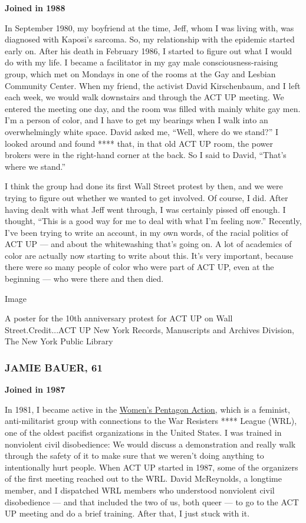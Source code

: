 \textbf{Joined in 1988}

In September 1980, my boyfriend at the time, Jeff, whom I was living
with, was diagnosed with Kaposi's sarcoma. So, my relationship with the
epidemic started early on. After his death in February 1986, I started
to figure out what I would do with my life. I became a facilitator in my
gay male consciousness-raising group, which met on Mondays in one of the
rooms at the Gay and Lesbian Community Center. When my friend, the
activist David Kirschenbaum, and I left each week, we would walk
downstairs and through the ACT UP meeting. We entered the meeting one
day, and the room was filled with mainly white gay men. I'm a person of
color, and I have to get my bearings when I walk into an overwhelmingly
white space. David asked me, ``Well, where do we stand?'' I looked
around and found **** that, in that old ACT UP room, the power brokers
were in the right-hand corner at the back. So I said to David, ``That's
where we stand.''

I think the group had done its first Wall Street protest by then, and we
were trying to figure out whether we wanted to get involved. Of course,
I did. After having dealt with what Jeff went through, I was certainly
pissed off enough. I thought, ``This is a good way for me to deal with
what I'm feeling now.'' Recently, I've been trying to write an account,
in my own words, of the racial politics of ACT UP --- and about the
whitewashing that's going on. A lot of academics of color are actually
now starting to write about this. It's very important, because there
were so many people of color who were part of ACT UP, even at the
beginning --- who were there and then died.

Image

A poster for the 10th anniversary protest for ACT UP on Wall
Street.Credit...ACT UP New York Records, Manuscripts and Archives
Division, The New York Public Library

\hypertarget{jamie-bauer-61}{%
\subsubsection{JAMIE BAUER, 61}\label{jamie-bauer-61}}

\textbf{Joined in 1987}

In 1981, I became active in the
\href{http://www.wloe.org/WLOE-en/background/wpastatem.html}{Women's
Pentagon Action}, which is a feminist, anti-militarist group with
connections to the War Resisters **** League (WRL), one of the oldest
pacifist organizations in the United States. I was trained in nonviolent
civil disobedience: We would discuss a demonstration and really walk
through the safety of it to make sure that we weren't doing anything to
intentionally hurt people. When ACT UP started in 1987, some of the
organizers of the first meeting reached out to the WRL. David
McReynolds, a longtime member, and I dispatched WRL members who
understood nonviolent civil disobedience --- and that included the two
of us, both queer --- to go to the ACT UP meeting and do a brief
training. After that, I just stuck with it.

